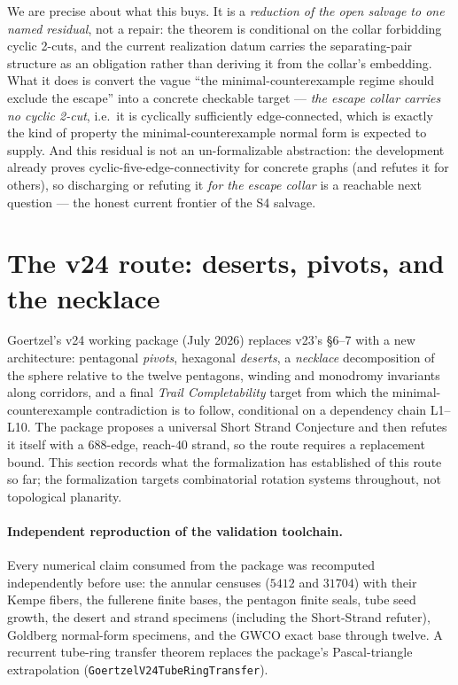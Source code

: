 \documentclass[11pt]{article}
\theoremstyle{definition}
\begin{document}
We are precise about what this buys. It is a \emph{reduction of the open salvage to
one named residual}, not a repair: the theorem is conditional on the collar
forbidding cyclic 2-cuts, and the current realization datum carries the
separating-pair structure as an obligation rather than deriving it from the collar's
embedding. What it does is convert the vague ``the minimal-counterexample regime
should exclude the escape'' into a concrete checkable target --- \emph{the escape
collar carries no cyclic 2-cut}, i.e.\ it is cyclically sufficiently edge-connected,
which is exactly the kind of property the minimal-counterexample normal form is
expected to supply. And this residual is not an un-formalizable abstraction: the
development already proves cyclic-five-edge-connectivity for concrete graphs (and
refutes it for others), so discharging or refuting it \emph{for the escape collar}
is a reachable next question --- the honest current frontier of the S4 salvage.

\section{The v24 route: deserts, pivots, and the necklace}
\label{sec:v24}

Goertzel's v24 working package (July 2026) replaces v23's \S6--7 with a new
architecture: pentagonal \emph{pivots}, hexagonal \emph{deserts}, a
\emph{necklace} decomposition of the sphere relative to the twelve pentagons,
winding and monodromy invariants along corridors, and a final \emph{Trail
Completability} target from which the minimal-counterexample contradiction is
to follow, conditional on a dependency chain L1--L10. The package proposes a
universal Short Strand Conjecture and then refutes it itself with a
$688$-edge, reach-$40$ strand, so the route requires a replacement bound.
This section records what the formalization has established of this route so
far; the formalization targets combinatorial rotation systems throughout, not
topological planarity.

\paragraph{Independent reproduction of the validation toolchain.} Every
numerical claim consumed from the package was recomputed independently before
use: the annular censuses ($5412$ and $31704$) with their Kempe fibers, the
fullerene finite bases, the pentagon finite seals, tube seed growth, the
desert and strand specimens (including the Short-Strand refuter), Goldberg
normal-form specimens, and the GWCO exact base through twelve. A recurrent
tube-ring transfer theorem replaces the package's Pascal-triangle
extrapolation (\texttt{GoertzelV24TubeRingTransfer}).
\end{document}

